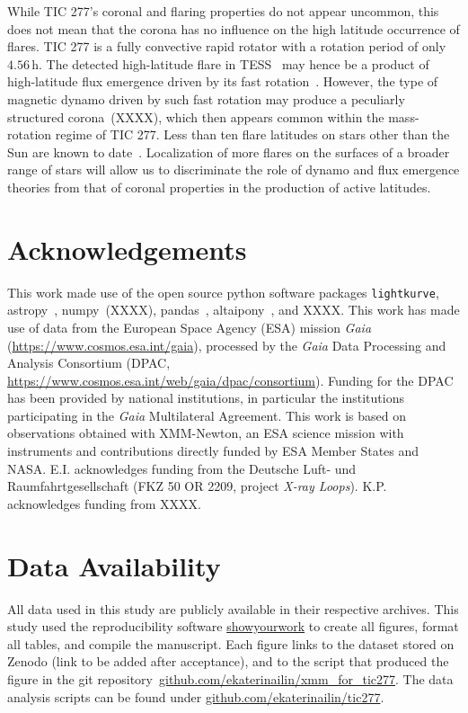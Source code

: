 \documentclass[twocolumn]{aastex631}
\begin{document}
While TIC 277's coronal and flaring properties do not appear uncommon, this does not mean that the corona has no influence on the high latitude occurrence of flares. TIC 277 is a fully convective rapid rotator with a rotation period of only $4.56\,$h. The detected high-latitude flare in TESS~\citep{ilin2021giant} may hence be a product of high-latitude flux emergence driven by its fast rotation~\citep{weber2016modeling,weber2017suppression}.
However, the type of magnetic dynamo driven by such fast rotation may produce a peculiarly structured corona~(XXXX), which then appears common within the mass-rotation regime of TIC 277. Less than ten flare latitudes on stars other than the Sun are known to date~\citep{wolter2008doppler, ilin2021giant, johnson2021simultaneous}. Localization of more flares on the surfaces of a broader range of stars will allow us to discriminate the role of dynamo and flux emergence theories from that of coronal properties in the production of active latitudes.


\section*{Acknowledgements}
This work made use of the open source python software packages \texttt{lightkurve}\citep{lightkurvecollaboration2018lightkurve}, astropy~\citep{robitaille2013astropy}, numpy~(XXXX), pandas~\citep{reback2022pandasdev}, altaipony~\citep{ilin2021altaipony}, and XXXX. This work has made use of data from the European Space Agency (ESA) mission
{\it Gaia} (\url{https://www.cosmos.esa.int/gaia}), processed by the {\it Gaia}
Data Processing and Analysis Consortium (DPAC,
\url{https://www.cosmos.esa.int/web/gaia/dpac/consortium}). Funding for the DPAC
has been provided by national institutions, in particular the institutions
participating in the {\it Gaia} Multilateral Agreement.
This work is based on observations obtained with XMM-Newton, an ESA science mission with instruments and contributions directly funded by ESA Member States and NASA. E.I. acknowledges funding from the Deutsche Luft- und Raumfahrtgesellschaft (FKZ 50 OR 2209, project \textit{X-ray Loops}). K.P. acknowledges funding from XXXX. 
\section*{Data Availability}
All data used in this study are publicly available in their respective archives.
This study used the reproducibility software \href{https://github.com/showyourwork/showyourwork}{showyourwork}
\citep{luger2021mappinga} to create all figures, format all tables, and compile the manuscript. Each figure links to the dataset stored on Zenodo (link to be added after acceptance), and to the script that produced the figure in the git repository~\href{https://github.com/ekaterinailin/xmm_for_tic277}{github.com/ekaterinailin/xmm\_for\_tic277}. The data analysis scripts can be found under \href{https://github.com/ekaterinailin/tic277}{github.com/ekaterinailin/tic277}. 


\end{document}
